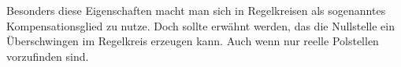 %
Besonders diese Eigenschaften macht man sich in Regelkreisen als sogenanntes Kompensationsglied zu nutze. Doch sollte erwähnt werden, das die Nullstelle ein Überschwingen im Regelkreis erzeugen kann. Auch wenn nur reelle Polstellen vorzufinden sind.
%
%
